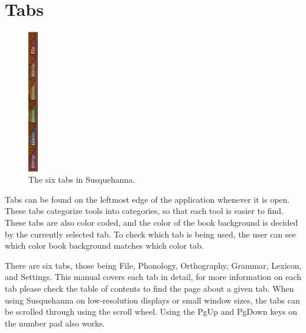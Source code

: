 \documentclass{report}
\begin{document}
	\section{Tabs}
	\begin{figure}
		\centering
		\includegraphics[width=0.038\textwidth]{img/tabs-screenshot}
		\caption{The six tabs in Susquehanna.}
		\label{fig:tabs-screenshot}
	\end{figure}
	Tabs can be found on the leftmost edge of the application whenever it is open. These tabs categorize tools into categories,	so that each tool is easier to find. These tabs are also color coded, and the color of the book background is decided by the currently selected tab. To check which tab is being used, the user can see which color book background matches which color tab.
	\par
	There are six tabs, those being File, Phonology, Orthography, Grammar, Lexicon, and Settings. This manual covers each tab in detail, for more information on each tab please check the table of contents to find the page about a given tab. When using Susquehanna on low-resolution displays or small window sizes, the tabs can be scrolled through using the scroll wheel. Using the PgUp and PgDown keys on the number pad also works. 
	\par
\end{document}
